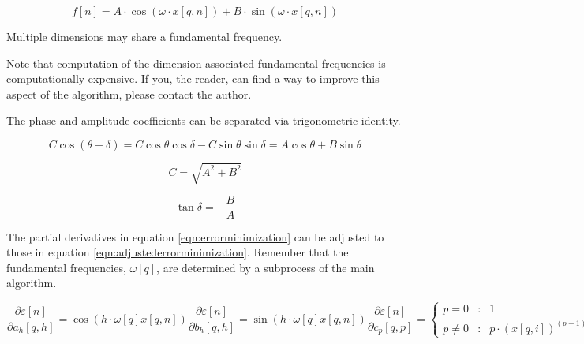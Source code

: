 \documentclass{article}
\begin{document}
\begin{equation}
\label{eqn:simplifiedfittedfunction}
f\left[n\right] = A \cdot \cos\left( \omega \cdot x\left[q, n\right] \right) + B \cdot \sin\left( \omega \cdot x\left[q, n\right] \right)
\end{equation}

\par{Multiple dimensions may share a fundamental frequency.}

\par{Note that computation of the dimension-associated fundamental frequencies is computationally expensive. If you, the reader, can find a way to improve this aspect of the algorithm, please contact the author.}

\par{The phase and amplitude coefficients can be separated via trigonometric identity.}

\begin{equation}
C \cos \left( \theta + \delta \right) = C \cos\theta \cos\delta - C \sin\theta \sin\delta = A \cos\theta + B \sin\theta
\end{equation}

\begin{equation}
C = \sqrt{A^2 + B^2}
\end{equation}

\begin{equation}
\tan\delta = - \frac{B}{A}
\end{equation}

\par{The partial derivatives in equation \eqref{eqn:errorminimization} can be adjusted to those in equation \eqref{eqn:adjustederrorminimization}. Remember that the fundamental frequencies, $\omega\left[q\right]$, are determined by a subprocess of the main algorithm.}

\begin{subequations}
\label{eqn:adjustederrorminimization}
\begin{equation}
\frac{\partial \varepsilon\left[ n \right]}{\partial a_h\left[q, h\right]} = \cos\left( h \cdot \omega\left[q\right] x\left[q, n\right] \right)
\end{equation}
\begin{equation}
\frac{\partial \varepsilon\left[ n \right]}{\partial b_h\left[q, h\right]} = \sin\left( h \cdot \omega\left[q\right] x\left[q, n\right] \right)
\end{equation}
\begin{equation}
\frac{\partial \varepsilon\left[ n \right]}{\partial c_p\left[q, p\right]} = \left\{\begin{array}{ccc}p = 0&:&1\\p\ne0&:&p \cdot \left( x\left[q, i \right] \right)^{\left( p - 1 \right)}\end{array}\right.
\end{equation}
\end{subequations}
\end{document}
